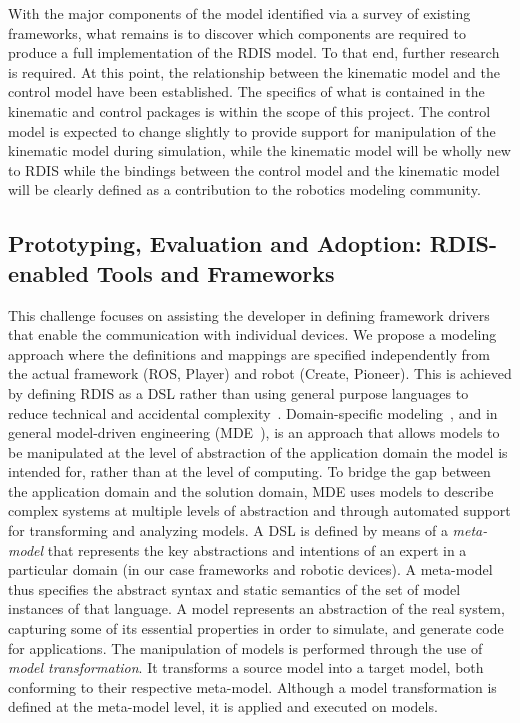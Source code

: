 With the major components of the model identified via a survey of existing frameworks, what remains is to discover which components are required to produce a full implementation of the RDIS model. To that end, further research is required. At this point, the relationship between the kinematic model and the control model have been established. The specifics of what is contained in the kinematic and control packages is within the scope of this project. The control model is expected to change slightly to provide support for manipulation of the kinematic model during simulation, while the kinematic model will be wholly new to RDIS while the bindings between the control model and the kinematic model will be clearly defined as a contribution to the robotics modeling community.


\subsection{Prototyping, Evaluation and Adoption: RDIS-enabled Tools and Frameworks}

This challenge focuses on assisting the developer in defining framework drivers that enable the communication with individual devices.
We propose a modeling approach where the definitions and mappings are specified independently from the actual framework (\eg ROS, Player) and robot (\eg Create, Pioneer).
This is achieved by defining RDIS as a DSL rather than using general purpose languages to reduce technical and accidental complexity~\cite{Brooks1987}.
Domain-specific modeling~\cite{Kelly2008}, and in general model-driven engineering (MDE~\cite{Stahl2006}), is an approach that allows models to be manipulated at the level of abstraction of the application domain the model is intended for, rather than at the level of computing.
To bridge the gap between the application domain and the solution domain, MDE uses models to describe complex systems at multiple levels of abstraction and through automated support for transforming and analyzing models.
A DSL is defined by means of a \emph{meta-model} that represents the key abstractions and intentions of an expert in a particular domain (in our case frameworks and robotic devices).
A meta-model thus specifies the abstract syntax and static semantics of the set of model instances of that language.
A model represents an abstraction of the real system, capturing some of its essential properties in order to simulate, and generate code for applications.
The manipulation of models is performed through the use of \emph{model transformation}.
It transforms a source model into a target model, both conforming to their respective meta-model.
Although a model transformation is defined at the meta-model level, it is applied and executed on models.

